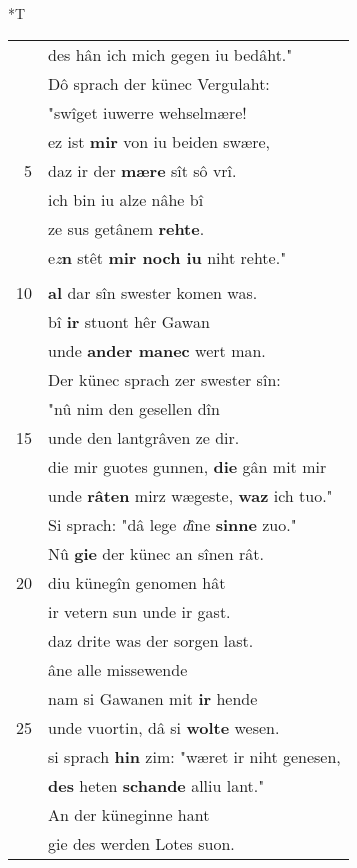 \documentclass[8pt,a4paper,notitlepage]{article}
\begin{document}
\begin{table}[ht]
\begin{minipage}[t]{0.5\linewidth}
\small
\begin{center}*T
\end{center}
\begin{tabular}{rl}
 & des hân ich mich gegen iu bedâht."\\ 
 & Dô sprach der künec Vergulaht:\\ 
 & "swîget iuwerre wehselmære!\\ 
 & ez ist \textbf{mir} von iu beiden swære,\\ 
5 & daz ir der \textbf{mære} sît sô vrî.\\ 
 & ich bin iu alze nâhe bî\\ 
 & ze sus getânem \textbf{rehte}.\\ 
 & e\textit{z}\textbf{n} stêt \textbf{mir noch iu} niht rehte."\\ 
 & \textbf{\begin{large}D\end{large}iz} was ûf dem palas,\\ 
10 & \textbf{al} dar sîn swester komen was.\\ 
 & bî \textbf{ir} stuont hêr Gawan\\ 
 & unde \textbf{ander manec} wert man.\\ 
 & Der künec sprach zer swester sîn:\\ 
 & "nû nim den gesellen dîn\\ 
15 & unde den lantgrâven ze dir.\\ 
 & die mir guotes gunnen, \textbf{die} gân mit mir\\ 
 & unde \textbf{râten} mirz wægeste, \textbf{waz} ich tuo."\\ 
 & Si sprach: "dâ lege \textit{d}îne \textbf{sinne} zuo."\\ 
 & Nû \textbf{gie} der künec an sînen rât.\\ 
20 & diu künegîn genomen hât\\ 
 & ir vetern sun unde ir gast.\\ 
 & daz drite was der sorgen last.\\ 
 & âne alle missewende\\ 
 & nam si Gawanen mit \textbf{ir} hende\\ 
25 & unde vuortin, dâ si \textbf{wolte} wesen.\\ 
 & si sprach \textbf{hin} zim: "wæret ir niht genesen,\\ 
 & \textbf{des} heten \textbf{schande} alliu lant."\\ 
 & An der küneginne hant\\ 
 & gie des werden Lotes suon.\\ 

\end{tabular}
\end{minipage}
\end{table}
\end{document}
